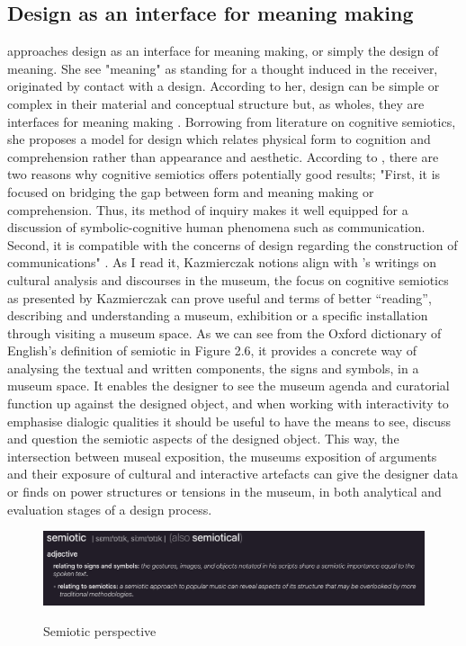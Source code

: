 \subsection{Design as an interface for meaning making}
\autocite{kazmierczak_meaningmaking_2003} approaches design as an interface for meaning making, or simply the design of meaning. She see "meaning" as standing for a thought induced in the receiver, originated by contact with a design. According to her, design can be simple or complex in their material and conceptual structure but, as wholes, they are interfaces for meaning making \autocite[p. 47]{kazmierczak_meaningmaking_2003}. Borrowing from literature on cognitive semiotics, she proposes a model for design which relates physical form to cognition and comprehension rather than appearance and aesthetic. According to \autocite{kazmierczak_meaningmaking_2003}, there are two reasons why cognitive semiotics offers potentially good results; "First, it is focused on bridging the gap between form and meaning making or comprehension. Thus, its method of inquiry makes it well equipped for a discussion of symbolic-cognitive human phenomena such as communication. Second, it is compatible with the concerns of design regarding the construction of communications" \autocite[p. 47]{kazmierczak_meaningmaking_2003}. 
As I read it, Kazmierczak notions align with \autocite{Miekebal_book}'s writings on cultural analysis and discourses in the museum, the focus on cognitive semiotics as presented by Kazmierczak can prove useful and terms of better “reading”, describing and understanding a museum, exhibition or a specific installation through visiting a museum space. As we can see from the Oxford dictionary of English's definition of semiotic in Figure 2.6, it provides a concrete way of analysing the textual and written components, the signs and symbols, in a museum space. It enables the designer to see the museum agenda and curatorial function up against the designed object, and when working with interactivity to emphasise dialogic qualities it should be useful to have the means to see, discuss and question the semiotic aspects of the designed object. This way, the intersection between museal exposition, the museums exposition of arguments and their exposure of cultural and interactive artefacts can give the designer data or finds on power structures or tensions in the museum, in both analytical and evaluation stages of a design process.

\begin{figure}[H]
\includegraphics[width=12.5cm]{pictures/background/semiotic.png}
\caption{Semiotic perspective}{\autocite{Oxford_dictionary}}
\centering
\end{figure}


